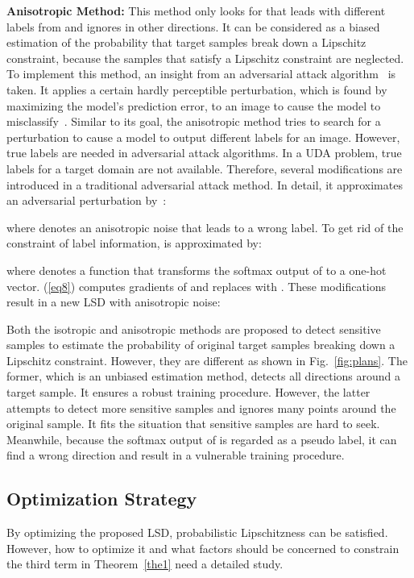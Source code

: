 \documentclass[journal,twocolumn]{IEEEtran}
\theoremstyle{definition}
\begin{document}
{\bf Anisotropic Method:} This method only looks for  that leads  with different labels from  and ignores  in other directions. It can be considered as a biased estimation of the probability that target samples break down a Lipschitz constraint, because the samples that satisfy a Lipschitz constraint are neglected. To implement this method, an insight from an adversarial attack algorithm~\cite{goodfellow2014explaining} is taken. It applies a certain hardly perceptible perturbation, which is found by maximizing the model's prediction error, to an image to cause the model to misclassify~\cite{goodfellow2014explaining}. Similar to its goal, the anisotropic method tries to search for a perturbation to cause a model to output different labels for an image. However, true labels are needed in adversarial attack algorithms. In a UDA problem, true labels for a target domain are not available. Therefore, several modifications are introduced in a traditional adversarial attack method. In detail, it approximates an adversarial perturbation by~\cite{goodfellow2014explaining}:

where  denotes an anisotropic noise that leads to a wrong label. To get rid of the constraint of label information,  is approximated by:

where  denotes a function that transforms the softmax output of  to a one-hot vector. (\ref{eq8}) computes gradients of  and replaces  with . These modifications result in a new LSD with anisotropic noise:


Both the isotropic and anisotropic methods are proposed to detect sensitive samples to estimate the probability of original target samples breaking down a Lipschitz constraint. However, they are different as shown in Fig.~\ref{fig:plans}. The former, which is an unbiased estimation method, detects all directions around a target sample. It ensures a robust training procedure. However, the latter attempts to detect more sensitive samples and ignores many points around the original sample. It fits the situation that sensitive samples are hard to seek. Meanwhile, because the softmax output of  is regarded as a pseudo label, it can find a wrong direction and result in a vulnerable training procedure.

\subsection{Optimization Strategy}

By optimizing the proposed LSD,  probabilistic Lipschitzness can be satisfied. However, how to optimize it and what factors should be concerned to constrain the third term in Theorem~\ref{the1} need a detailed study.
\end{document}
